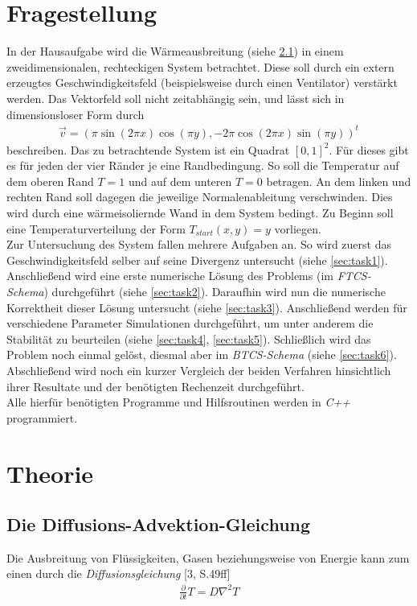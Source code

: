 \documentclass[12pt,a4paper,titlepage,headinclude,bibtotoc]{scrartcl}
\begin{document}
\section{Fragestellung}
\label{sec:fragestellung}
In der Hausaufgabe wird die Wärmeausbreitung (siehe \ref{sec:diff_adv}) in einem zweidimensionalen, rechteckigen System betrachtet. Diese soll durch ein extern erzeugtes Geschwindigkeitsfeld (beispielsweise durch einen Ventilator) verstärkt werden. Das Vektorfeld soll nicht zeitabhängig sein, und lässt sich in dimensionsloser Form durch
\begin{align*}
\vec{v} = (\pi \sin(2\pi x) \cos(\pi y), -2 \pi \cos(2\pi x) \sin(\pi y))^t
\end{align*}
beschreiben. Das zu betrachtende System ist ein Quadrat $[0,1]^2$. Für dieses gibt es für jeden der vier Ränder je eine Randbedingung. So soll die Temperatur auf dem oberen Rand $T=1$ und auf dem unteren $T=0$ betragen. An dem linken und rechten Rand soll dagegen die jeweilige Normalenableitung verschwinden. Dies wird durch eine wärmeisoliernde Wand in dem System bedingt. Zu Beginn soll eine Temperaturverteilung der Form $T_{start}(x, y) = y$ vorliegen.\\

Zur Untersuchung des System fallen mehrere Aufgaben an. So wird zuerst das Geschwindigkeitsfeld selber auf seine Divergenz untersucht (siehe \ref{sec:task1}). Anschließend wird eine erste numerische Lösung des Problems (im \textit{FTCS-Schema}) durchgeführt (siehe \ref{sec:task2}). Daraufhin wird nun die numerische Korrektheit dieser Lösung untersucht (siehe \ref{sec:task3}). Anschließend werden für verschiedene Parameter Simulationen durchgeführt, um unter anderem die Stabilität zu beurteilen (siehe \ref{sec:task4}, \ref{sec:task5}). Schließlich wird das Problem noch einmal gelöst, diesmal aber im \textit{BTCS-Schema} (siehe \ref{sec:task6}).\\
Abschließend wird noch ein kurzer Vergleich der beiden Verfahren hinsichtlich ihrer Resultate und der benötigten Rechenzeit durchgeführt.\\
Alle hierfür benötigten Programme und Hilfsroutinen werden in \textit{C++} programmiert.

\section{Theorie}
\label{sec:theorie}
\subsection{Die Diffusions-Advektion-Gleichung}
\label{sec:diff_adv}
Die Ausbreitung von Flüssigkeiten, Gasen beziehungsweise von Energie kann zum einen durch die \textit{Diffusionsgleichung} [3, S.49ff]
\begin{align}
\label{eq:diff}
\frac{\partial}{\partial t}T = D \nabla^2 T 
\end{align}
\end{document}
